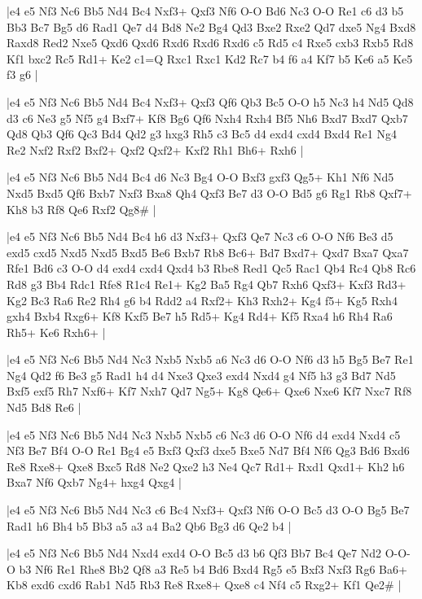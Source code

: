 \whitename{}
\blackname{}
\makegametitle
|e4 e5 Nf3 Nc6 Bb5 Nd4 Bc4 Nxf3+ Qxf3 Nf6 O-O Bd6 Nc3 O-O Re1 c6 d3 b5 Bb3 Bc7 Bg5 d6 Rad1 Qe7 d4 Bd8 Ne2 Bg4 Qd3 Bxe2 Rxe2 Qd7 dxe5 Ng4 Bxd8 Raxd8 Red2 Nxe5 Qxd6 Qxd6 Rxd6 Rxd6 Rxd6 c5 Rd5 c4 Rxe5 cxb3 Rxb5 Rd8 Kf1 bxc2 Rc5 Rd1+ Ke2 c1=Q Rxc1 Rxc1 Kd2 Rc7 b4 f6 a4 Kf7 b5 Ke6 a5 Ke5 f3 g6  |

\whitename{}
\blackname{}
\makegametitle
|e4 e5 Nf3 Nc6 Bb5 Nd4 Bc4 Nxf3+ Qxf3 Qf6 Qb3 Bc5 O-O h5 Nc3 h4 Nd5 Qd8 d3 c6 Ne3 g5 Nf5 g4 Bxf7+ Kf8 Bg6 Qf6 Nxh4 Rxh4 Bf5 Nh6 Bxd7 Bxd7 Qxb7 Qd8 Qb3 Qf6 Qc3 Bd4 Qd2 g3 hxg3 Rh5 c3 Bc5 d4 exd4 cxd4 Bxd4 Re1 Ng4 Re2 Nxf2 Rxf2 Bxf2+ Qxf2 Qxf2+ Kxf2 Rh1 Bh6+ Rxh6  |

\whitename{}
\blackname{}
\makegametitle
|e4 e5 Nf3 Nc6 Bb5 Nd4 Bc4 d6 Nc3 Bg4 O-O Bxf3 gxf3 Qg5+ Kh1 Nf6 Nd5 Nxd5 Bxd5 Qf6 Bxb7 Nxf3 Bxa8 Qh4 Qxf3 Be7 d3 O-O Bd5 g6 Rg1 Rb8 Qxf7+ Kh8 b3 Rf8 Qe6 Rxf2 Qg8\#  |

\whitename{}
\blackname{}
\makegametitle
|e4 e5 Nf3 Nc6 Bb5 Nd4 Bc4 h6 d3 Nxf3+ Qxf3 Qe7 Nc3 c6 O-O Nf6 Be3 d5 exd5 cxd5 Nxd5 Nxd5 Bxd5 Be6 Bxb7 Rb8 Bc6+ Bd7 Bxd7+ Qxd7 Bxa7 Qxa7 Rfe1 Bd6 c3 O-O d4 exd4 cxd4 Qxd4 b3 Rbe8 Red1 Qc5 Rac1 Qb4 Rc4 Qb8 Rc6 Rd8 g3 Bb4 Rdc1 Rfe8 R1c4 Re1+ Kg2 Ba5 Rg4 Qb7 Rxh6 Qxf3+ Kxf3 Rd3+ Kg2 Bc3 Ra6 Re2 Rh4 g6 b4 Rdd2 a4 Rxf2+ Kh3 Rxh2+ Kg4 f5+ Kg5 Rxh4 gxh4 Bxb4 Rxg6+ Kf8 Kxf5 Be7 h5 Rd5+ Kg4 Rd4+ Kf5 Rxa4 h6 Rh4 Ra6 Rh5+ Ke6 Rxh6+  |

\whitename{}
\blackname{}
\makegametitle
|e4 e5 Nf3 Nc6 Bb5 Nd4 Nc3 Nxb5 Nxb5 a6 Nc3 d6 O-O Nf6 d3 h5 Bg5 Be7 Re1 Ng4 Qd2 f6 Be3 g5 Rad1 h4 d4 Nxe3 Qxe3 exd4 Nxd4 g4 Nf5 h3 g3 Bd7 Nd5 Bxf5 exf5 Rh7 Nxf6+ Kf7 Nxh7 Qd7 Ng5+ Kg8 Qe6+ Qxe6 Nxe6 Kf7 Nxc7 Rf8 Nd5 Bd8 Re6  |

\whitename{}
\blackname{}
\makegametitle
|e4 e5 Nf3 Nc6 Bb5 Nd4 Nc3 Nxb5 Nxb5 c6 Nc3 d6 O-O Nf6 d4 exd4 Nxd4 c5 Nf3 Be7 Bf4 O-O Re1 Bg4 e5 Bxf3 Qxf3 dxe5 Bxe5 Nd7 Bf4 Nf6 Qg3 Bd6 Bxd6 Re8 Rxe8+ Qxe8 Bxc5 Rd8 Ne2 Qxe2 h3 Ne4 Qc7 Rd1+ Rxd1 Qxd1+ Kh2 h6 Bxa7 Nf6 Qxb7 Ng4+ hxg4 Qxg4  |

\whitename{}
\blackname{}
\makegametitle
|e4 e5 Nf3 Nc6 Bb5 Nd4 Nc3 c6 Bc4 Nxf3+ Qxf3 Nf6 O-O Bc5 d3 O-O Bg5 Be7 Rad1 h6 Bh4 b5 Bb3 a5 a3 a4 Ba2 Qb6 Bg3 d6 Qe2 b4  |

\whitename{}
\blackname{}
\makegametitle
|e4 e5 Nf3 Nc6 Bb5 Nd4 Nxd4 exd4 O-O Bc5 d3 b6 Qf3 Bb7 Bc4 Qe7 Nd2 O-O-O b3 Nf6 Re1 Rhe8 Bb2 Qf8 a3 Re5 b4 Bd6 Bxd4 Rg5 e5 Bxf3 Nxf3 Rg6 Ba6+ Kb8 exd6 cxd6 Rab1 Nd5 Rb3 Re8 Rxe8+ Qxe8 c4 Nf4 c5 Rxg2+ Kf1 Qe2\#  |

